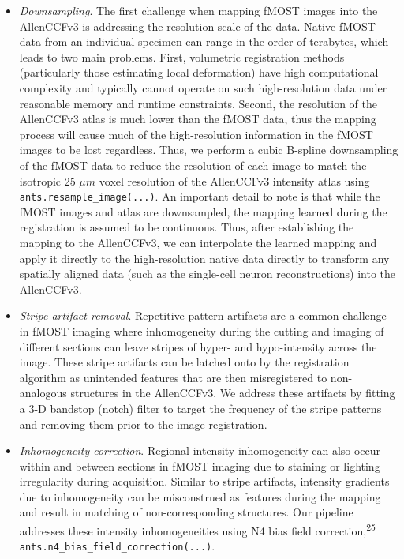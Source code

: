 \documentclass[
  12pt,
]{article}
\begin{document}
\begin{itemize}
\item
  \emph{Downsampling}. The first challenge when mapping fMOST images
  into the AllenCCFv3 is addressing the resolution scale of the data.
  Native fMOST data from an individual specimen can range in the order
  of terabytes, which leads to two main problems. First, volumetric
  registration methods (particularly those estimating local deformation)
  have high computational complexity and typically cannot operate on
  such high-resolution data under reasonable memory and runtime
  constraints. Second, the resolution of the AllenCCFv3 atlas is much
  lower than the fMOST data, thus the mapping process will cause much of
  the high-resolution information in the fMOST images to be lost
  regardless. Thus, we perform a cubic B-spline downsampling of the
  fMOST data to reduce the resolution of each image to match the
  isotropic 25 \(\mu m\) voxel resolution of the AllenCCFv3 intensity
  atlas using \texttt{ants.resample\_image(...)}. An important detail to
  note is that while the fMOST images and atlas are downsampled, the
  mapping learned during the registration is assumed to be continuous.
  Thus, after establishing the mapping to the AllenCCFv3, we can
  interpolate the learned mapping and apply it directly to the
  high-resolution native data directly to transform any spatially
  aligned data (such as the single-cell neuron reconstructions) into the
  AllenCCFv3.
\item
  \emph{Stripe artifact removal}. Repetitive pattern artifacts are a
  common challenge in fMOST imaging where inhomogeneity during the
  cutting and imaging of different sections can leave stripes of hyper-
  and hypo-intensity across the image. These stripe artifacts can be
  latched onto by the registration algorithm as unintended features that
  are then misregistered to non-analogous structures in the AllenCCFv3.
  We address these artifacts by fitting a 3-D bandstop (notch) filter to
  target the frequency of the stripe patterns and removing them prior to
  the image registration.
\item
  \emph{Inhomogeneity correction}. Regional intensity inhomogeneity can
  also occur within and between sections in fMOST imaging due to
  staining or lighting irregularity during acquisition. Similar to
  stripe artifacts, intensity gradients due to inhomogeneity can be
  misconstrued as features during the mapping and result in matching of
  non-corresponding structures. Our pipeline addresses these intensity
  inhomogeneities using N4 bias field correction,\textsuperscript{25}
  \texttt{ants.n4\_bias\_field\_correction(...)}.
\end{itemize}
\end{document}
